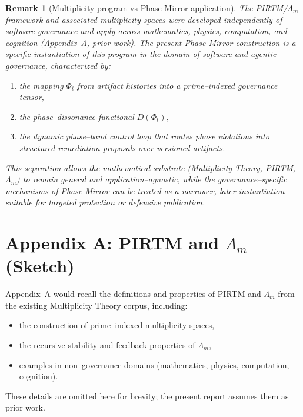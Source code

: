 \documentclass[11pt]{article}
\newtheorem{remark}[theorem]{Remark}
\begin{document}
\begin{remark}[Multiplicity program vs Phase Mirror application]\label{rem:program}
The PIRTM/$\Lambda_m$ framework and associated multiplicity spaces were developed independently of software governance and apply across mathematics, physics, computation, and cognition (Appendix~A, prior work). The present Phase Mirror construction is a specific instantiation of this program in the domain of software and agentic governance, characterized by:
\begin{enumerate}
  \item the mapping $\Phi_t$ from artifact histories into a prime--indexed governance tensor,
  \item the phase--dissonance functional $D(\Phi_t)$,
  \item the dynamic phase--band control loop that routes phase violations into structured remediation proposals over versioned artifacts.
\end{enumerate}
This separation allows the mathematical substrate (Multiplicity Theory, PIRTM, $\Lambda_m$) to remain general and application--agnostic, while the governance--specific mechanisms of Phase Mirror can be treated as a narrower, later instantiation suitable for targeted protection or defensive publication.
\end{remark}

\appendix

\section{Appendix A: PIRTM and $\Lambda_m$ (Sketch)}

Appendix~A would recall the definitions and properties of PIRTM and $\Lambda_m$ from the existing Multiplicity Theory corpus, including:
\begin{itemize}
  \item the construction of prime--indexed multiplicity spaces,
  \item the recursive stability and feedback properties of $\Lambda_m$,
  \item examples in non--governance domains (mathematics, physics, computation, cognition).
\end{itemize}
These details are omitted here for brevity; the present report assumes them as prior work.
\end{document}
